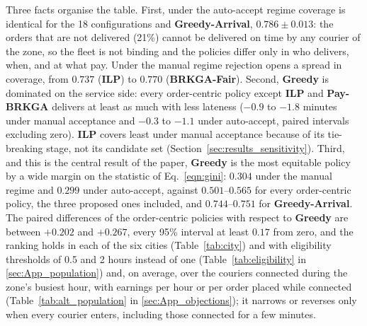 \documentclass[a4paper,11pt,review,3p,authoryear]{elsarticle}
\begin{document}
Three facts organise the table. First, under the auto-accept regime coverage is identical for the 18 configurations and \textbf{Greedy-Arrival}, $0.786 \pm 0.013$: the orders that are not delivered (21\%) cannot be delivered on time by any courier of the zone, so the fleet is not binding and the policies differ only in who delivers, when, and at what pay. Under the manual regime rejection opens a spread in coverage, from $0.737$ (\textbf{ILP}) to $0.770$ (\textbf{BRKGA-Fair}). Second, \textbf{Greedy} is dominated on the service side: every order-centric policy except \textbf{ILP} and \textbf{Pay-BRKGA} delivers at least as much with less lateness ($-0.9$ to $-1.8$ minutes under manual acceptance and $-0.3$ to $-1.1$ under auto-accept, paired intervals excluding zero). \textbf{ILP} covers least under manual acceptance because of its tie-breaking stage, not its candidate set (Section~\ref{sec:results_sensitivity}). Third, and this is the central result of the paper, \textbf{Greedy} is the most equitable policy by a wide margin on the statistic of Eq.~\eqref{eqn:gini}: $0.304$ under the manual regime and $0.299$ under auto-accept, against $0.501$--$0.565$ for every order-centric policy, the three proposed ones included, and $0.744$--$0.751$ for \textbf{Greedy-Arrival}. The paired differences of the order-centric policies with respect to \textbf{Greedy} are between $+0.202$ and $+0.267$, every 95\% interval at least $0.17$ from zero, and the ranking holds in each of the six cities (Table~\ref{tab:city}) and with eligibility thresholds of 0.5 and 2 hours instead of one (Table~\ref{tab:eligibility} in \ref{sec:App_population}) and, on average, over the couriers connected during the zone's busiest hour, with earnings per hour or per order placed while connected (Table~\ref{tab:alt_population} in \ref{sec:App_objections}); it narrows or reverses only when every courier enters, including those connected for a few minutes.
\end{document}
